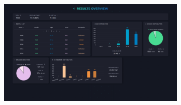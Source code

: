 \bigskip
\begin{figure}[H]
	\centering
	\begin{subfigure}[c]{0.74\textwidth}
			\centering
			\includegraphics[width=\textwidth]{imagenes/dashboard-martinc-500.png}
			\label{fig:casouso_dashboard_martinc_escritorio}
	\end{subfigure}
	\hfill
	\begin{subfigure}[c]{0.21\textwidth}
			\centering

\end{subfigure}
\end{figure}
